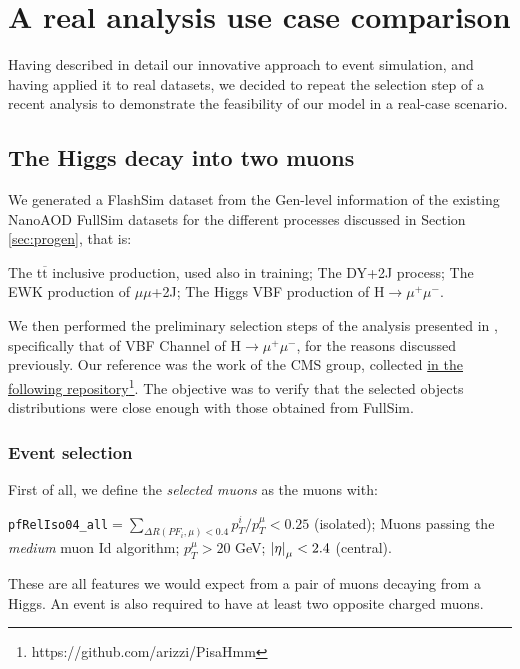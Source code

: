 \chapter{A real analysis use case comparison}\label{ch:benan} %
Having described in detail our innovative approach to event simulation, and having applied it to real datasets, we decided to repeat the selection step of a recent analysis to demonstrate the feasibility of our model in a real-case scenario.

\section{The Higgs decay into two muons}
We generated a FlashSim dataset from the Gen-level information of the existing NanoAOD FullSim datasets for the different processes discussed in Section \ref{sec:progen}, that is:

\begin{outline}
\1 The t$\overline{\text{t}}$ inclusive production, used also in training;
\1 The DY+2J process;
\1 The EWK production of $\mu\mu$+2J;
\1 The Higgs VBF production of H$\rightarrow\mu^+\mu^-$.
\end{outline}

We then performed the preliminary selection steps of the analysis presented in \cite{Sirunyan_2021}, specifically that of VBF Channel of H$\rightarrow\mu^+\mu^-$, for the reasons discussed previously.
Our reference was the work of the CMS group, collected \href{https://github.com/arizzi/PisaHmm}{in the following repository}\footnote{https://github.com/arizzi/PisaHmm}. The objective was to verify that the selected objects distributions were close enough with those obtained from FullSim.

\subsection{Event selection}

First of all, we define the \emph{selected muons} as the muons with:
\begin{outline}
\1 \texttt{pfRelIso04\_all}$= \sum_{\Delta R(PF_i, \mu)<0.4}p_T^i/p_T^{\mu}<0.25$ (isolated);
\1  Muons passing the \emph{medium} muon Id algorithm;
\1  $p_T^{\mu}>20$ GeV;
\1  $\abs{\eta}_{\mu}<2.4$ (central).
\end{outline}

These are all features we would expect from a pair of muons decaying from a Higgs. An event is also required to have at least two opposite charged muons.

